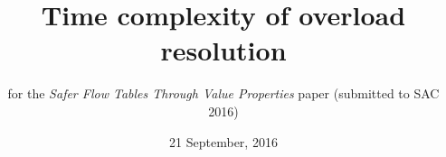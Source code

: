 \documentclass{scrartcl}%
\begin{document}
  \title{Time complexity of overload resolution}
  \subtitle{for the \textit{Safer Flow Tables Through Value Properties} paper (submitted to SAC 2016)}
  \date{21 September, 2016}
  \maketitle

  
  
\end{document}
